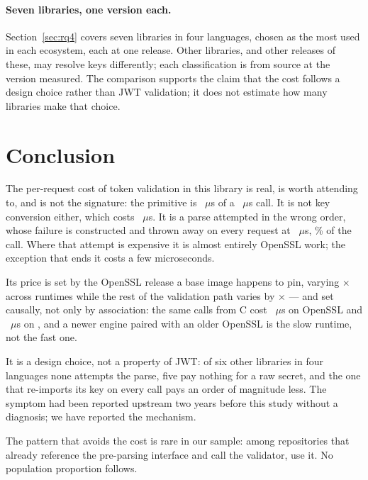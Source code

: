 \documentclass[pdflatex,sn-basic,twocolumn]{sn-jnl}%
\begin{document}
\paragraph{Seven libraries, one version each.} Section~\ref{sec:rq4} covers
seven libraries in four languages, chosen as the most used in each ecosystem,
each at one release. Other libraries, and other releases of these, may resolve
keys differently; each classification is from source at the version measured.
The comparison supports the claim that the cost follows a design choice rather
than JWT validation; it does not estimate how many libraries make that
choice.

\section{Conclusion}\label{sec:conclusion}

The per-request cost of token validation in this library is real, is worth
attending to, and is not the signature: the primitive is \HostHmacString~$\mu$s
of a \HostJwtString~$\mu$s call. It is not key conversion either, which costs
\HostCreateSecretKey~$\mu$s. It is a parse attempted in the wrong order, whose
failure is constructed and thrown away on every request at
\HostProbeThrows~$\mu$s, \HostProbeShareOfCall\% of the call. Where that attempt is expensive it is
almost entirely OpenSSL work; the exception that ends it costs a few
microseconds.

Its price is set by the OpenSSL release a base image happens to pin, varying
\SpanProbeThrows$\times$ across runtimes while the rest of the validation path
varies by \SpanJwtPreparsed$\times$ --- and set causally, not only by
association: the same calls from C cost \CFullVThreeZeroSixteen~$\mu$s on
OpenSSL \CVersionLiteralVThreeZeroSixteen{} and \CFullVThreeFiveEight~$\mu$s on \CVersionLiteralVThreeFiveEight, and a newer engine
paired with an older OpenSSL is the slow runtime, not the fast one.

It is a design choice, not a property of JWT: of six other libraries in four
languages none attempts the parse, five pay nothing for a raw secret, and the
one that re-imports its key on every call pays an order of magnitude less. The symptom had been reported upstream two
years before this study without a diagnosis; we have reported the mechanism.

The pattern that avoids the cost is rare in our sample: among
\CounterReposWithVerify{} repositories that already reference the pre-parsing
interface and call the validator, \AdjudicatedGenuineProjects{} use it. No
population proportion follows.
\end{document}
